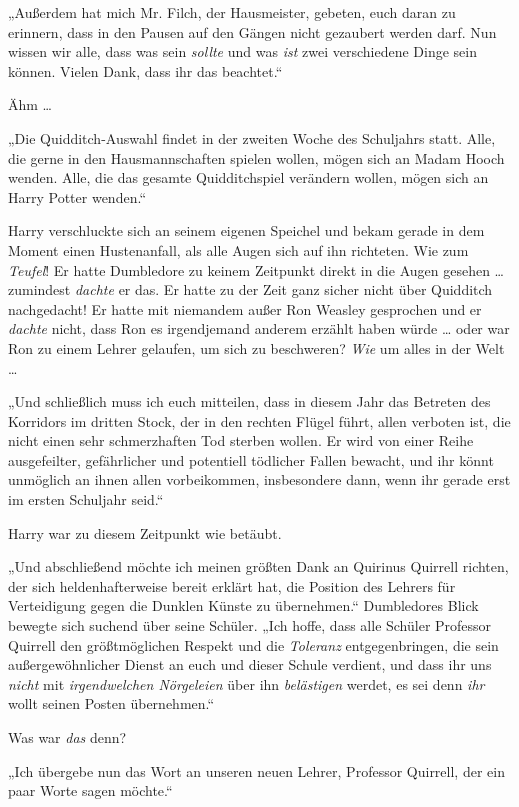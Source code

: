 „Außerdem hat mich Mr. Filch, der Hausmeister, gebeten, euch daran zu erinnern, dass in den Pausen auf den Gängen nicht gezaubert werden darf. Nun wissen wir alle, dass was sein \emph{sollte} und was \emph{ist} zwei verschiedene Dinge sein können. Vielen Dank, dass ihr das beachtet.“

Ähm …

„Die Quidditch-Auswahl findet in der zweiten Woche des Schuljahrs statt. Alle, die gerne in den Hausmannschaften spielen wollen, mögen sich an Madam Hooch wenden. Alle, die das gesamte Quidditchspiel verändern wollen, mögen sich an Harry Potter wenden.“

Harry verschluckte sich an seinem eigenen Speichel und bekam gerade in dem Moment einen Hustenanfall, als alle Augen sich auf ihn richteten. Wie zum \emph{Teufel}! Er hatte Dumbledore zu keinem Zeitpunkt direkt in die Augen gesehen … zumindest \emph{dachte} er das. Er hatte zu der Zeit ganz sicher nicht über Quidditch nachgedacht! Er hatte mit niemandem außer Ron Weasley gesprochen und er \emph{dachte} nicht, dass Ron es irgendjemand anderem erzählt haben würde … oder war Ron zu einem Lehrer gelaufen, um sich zu beschweren? \emph{Wie} um alles in der Welt …

„Und schließlich muss ich euch mitteilen, dass in diesem Jahr das Betreten des Korridors im dritten Stock, der in den rechten Flügel führt, allen verboten ist, die nicht einen sehr schmerzhaften Tod sterben wollen. Er wird von einer Reihe ausgefeilter, gefährlicher und potentiell tödlicher Fallen bewacht, und ihr könnt unmöglich an ihnen allen vorbeikommen, insbesondere dann, wenn ihr gerade erst im ersten Schuljahr seid.“

Harry war zu diesem Zeitpunkt wie betäubt.

„Und abschließend möchte ich meinen größten Dank an Quirinus Quirrell richten, der sich heldenhafterweise bereit erklärt hat, die Position des Lehrers für Verteidigung gegen die Dunklen Künste zu übernehmen.“ Dumbledores Blick bewegte sich suchend über seine Schüler. „Ich hoffe, dass alle Schüler Professor Quirrell den größtmöglichen Respekt und die \emph{Toleranz} entgegenbringen, die sein außergewöhnlicher Dienst an euch und dieser Schule verdient, und dass ihr uns \emph{nicht} mit \emph{irgendwelchen Nörgeleien} über ihn \emph{belästigen} werdet, es sei denn \emph{ihr} wollt seinen Posten übernehmen.“

Was war \emph{das} denn?

„Ich übergebe nun das Wort an unseren neuen Lehrer, Professor Quirrell, der ein paar Worte sagen möchte.“

